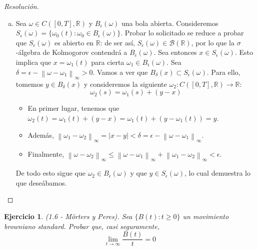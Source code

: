 \documentclass[a4paper,11pt]{article}
\newcommand{\norm}[1]{\left\lVert#1\right\rVert}
\newcommand{\normi}[1]{\norm{#1}_{\infty}}
\newcommand{\CT}{\ensuremath{C([0,T], \mathbb{R})}}
\newcommand{\Bor}[1]{\ensuremath{\mathcal{B}(#1)}}
\newcommand{\Bola}[2]{\ensuremath{B_{#2}(#1)}}
\newtheorem*{ej}{Ejercicio}
\begin{document}
\begin{proof}[Resoluci\'on]
\begin{enumerate}[a)]
    \item Sea $\omega \in \CT$ y \Bola{\omega}{\epsilon} una bola abierta.
    Consideremos
    $S_{\epsilon}(\omega) = \{ \omega_0(t) : \omega_0 \in \Bola{\omega}{\epsilon} \}$.
    Probar lo solicitado se reduce a probar que $S_{\epsilon}(\omega)$
    es abierto en $\mathbb{R}$: de ser así, $S_{\epsilon}(\omega) \in \Bor{\mathbb{R}}$,
    por lo que la $\sigma$-álgebra de Kolmogorov contendrá a \Bola{\omega}{\epsilon}.
    Sea entonces $x \in S_{\epsilon}(\omega)$. Esto implica que $x = \omega_1(t)$ para
    cierta $\omega_1 \in \Bola{\omega}{\epsilon}$. Sea
    $\delta = \epsilon - \normi{\omega - \omega_1} > 0$. Vamos a ver que 
    $\Bola{x}{\delta} \subset S_{\epsilon}(\omega)$. Para ello, tomemos
    $y \in \Bola{x}{\delta}$ y consideremos la siguiente $\omega_2 : \CT \to \mathbb{R}$:
    $$\omega_2(s) = \omega_1(s) + (y - x)$$
    \begin{itemize}
        \item En primer lugar, tenemos que $\omega_2(t) = \omega_1(t) + (y - x)
        = \omega_1(t) + (y - \omega_1(t)) = y$.
        \item Además, $\normi{\omega_1 - \omega_2} = |x - y| < \delta = \epsilon - \normi{\omega - \omega_1}$.
        \item Finalmente, $\normi{\omega - \omega_2} \leq \normi{\omega - \omega_1} + \normi{\omega_1 - \omega_2}
        < \epsilon$.
    \end{itemize}
    De todo esto sigue que $\omega_2 \in \Bola{\omega}{\epsilon}$ y que $y \in S_{\epsilon}(\omega)$,
    lo cual demuestra lo que deseábamos.

\end{enumerate}

\end{proof}


\begin{ej}
    (1.6 - Mörters y Peres). Sea $\{B(t) : t \geq 0\}$ un movimiento browniano
    standard. Probar que, casi seguramente,
    $$\lim_{t \to \infty}{\frac{B(t)}{t}} = 0$$ 
\end{ej}
\end{document}
